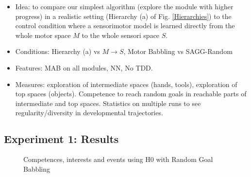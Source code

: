 \documentclass[conference]{include/IEEEtran}
\begin{document}
		\begin{itemize}
			\item Idea: to compare our simplest algorithm (explore the module with higher progress) in a realistic setting (Hierarchy (a) of Fig. \ref{Hierarchies}) to the control condition where a sensorimotor model is learned
					directly from the whole motor space $M$ to the whole sensori space $S$.
			
			\item Conditions: Hierarchy (a) vs $M \rightarrow S$, Motor Babbling vs SAGG-Random
			
			\item Features: MAB on all modules, NN, No TDD.
			
			\item Measures: exploration of intermediate spaces (hands, tools), exploration of top spaces (objects). Competence to reach random goals in reachable parts of intermediate and top spaces. 
					Statistics on multiple runs to see regularity/diversity in developmental trajectories.
		\end{itemize}
		
			
	\subsection{Experiment 1: Results}
	
		\begin{figure}[!t]
			\centering
			\caption{Competences, interests and events using H0 with Random Goal Babbling}
			\label{resH0GB}
		\end{figure}
		
\end{document}
